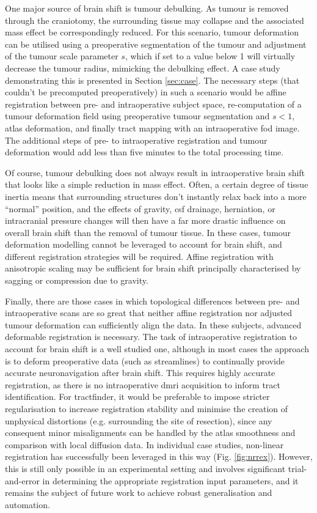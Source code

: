 \documentclass[12pt,phd,a4paper,twoside]{ucl_thesis}
\begin{document}
One major source of brain shift is tumour debulking.
As tumour is removed through the craniotomy, the surrounding tissue may collapse and the associated mass effect be correspondingly reduced.
For this scenario, tumour deformation can be utilised using a preoperative segmentation of the tumour and adjustment of the tumour scale parameter $s$, which if set to a value below 1 will virtually decrease the tumour radius, mimicking the debulking effect.
A case study demonstrating this is presented in Section \ref{sec:case}.
The necessary steps (that couldn't be precomputed preoperatively) in such a scenario would be affine registration between pre- and intraoperative subject space, re-computation of a tumour deformation field using preoperative tumour segmentation and $s<1$, atlas deformation, and finally tract mapping with an intraoperative \gls{fod} image.
The additional steps of pre- to intraoperative registration and tumour deformation would add less than five minutes to the total processing time.

Of course, tumour debulking does not always result in intraoperative brain shift that looks like a simple reduction in mass effect.
Often, a certain degree of tissue inertia means that surrounding structures don't instantly relax back into a more ``normal'' position, and the effects of gravity, \gls{csf} drainage, herniation, or intracranial pressure changes will then have a far more drastic influence on overall brain shift than the removal of tumour tissue.
In these cases, tumour deformation modelling cannot be leveraged to account for brain shift, and different registration strategies will be required.
Affine registration with anisotropic scaling may be sufficient for brain shift principally characterised by sagging or compression due to gravity.

Finally, there are those cases in which topological differences between pre- and intraoperative scans are so great that neither affine registration nor adjusted tumour deformation can sufficiently align the data.
In these subjects, advanced deformable registration is necessary.
The task of intraoperative registration to account for brain shift is a well studied one, although in most cases the approach is to deform preoperative data (such as streamlines) to continually provide accurate neuronavigation after brain shift\autocite{Clatz2005,Archip2007,Wittek2007,Archip2008}.
This requires highly accurate registration, as there is no intraoperative \gls{dmri} acquisition to inform tract identification.
For tractfinder, it would be preferable to impose stricter regularisation to increase registration stability and minimise the creation of unphysical distortions (e.g. surrounding the site of resection), since any consequent minor misalignments can be handled by the atlas smoothness and comparison with local diffusion data.
In individual case studies, non-linear registration has successfully been leveraged in this way (Fig. \ref{fig:nrrex}).
However, this is still only possible in an experimental setting and involves significant trial-and-error in determining the appropriate registration input parameters, and it remains the subject of future work to achieve robust generalisation and automation.
\end{document}

